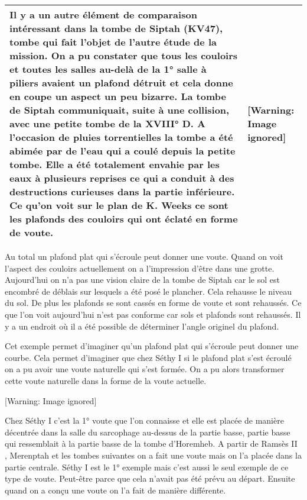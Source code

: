 \documentclass{article}
\begin{document}
\begin{flushleft}
\tablehead{}
\begin{supertabular}{|m{8.919001cm}|m{8.937cm}|}
\hline
Il y a un autre élément de comparaison intéressant dans la tombe de
Siptah (KV47), tombe qui fait l’objet de l’autre étude de la mission.
On a pu constater que tous les couloirs et toutes les salles au-delà de
la 1° salle à piliers avaient un plafond détruit et cela donne en coupe
un aspect un peu bizarre. La tombe de Siptah communiquait, suite à une
collision, avec une petite tombe de la XVIII° D. A l’occasion de pluies
torrentielles la tombe a été abimée par de l’eau qui a coulé depuis la
petite tombe. Elle a été totalement envahie par les eaux à plusieurs
reprises ce qui a conduit à des destructions curieuses dans la partie
inférieure. Ce qu’on voit sur le plan de K. Weeks ce sont les plafonds
des couloirs qui ont éclaté en forme de voute. 

 &
  [Warning: Image ignored] %
 \\\hline
\end{supertabular}
\end{flushleft}
Au total un plafond plat qui s’écroule peut donner une voute. Quand on
voit l’aspect des couloirs  actuellement on a l’impression d’être dans
une  grotte. Aujourd’hui on n’a pas une vision claire de la tombe de
Siptah car le sol est encombré de déblais sur lesquels a été posé le
plancher. Cela rehausse le niveau du sol. De plus les plafonds se sont
cassés en forme de voute et sont rehaussés. Ce que l’on voit
aujourd’hui n’est pas conforme car sols et plafonds sont rehaussés. Il
y a un endroit où il a été possible de déterminer l’angle originel du
plafond.

Cet exemple permet d’imaginer qu’un plafond plat qui s’écroule peut
donner une courbe. Cela permet d’imaginer que chez Séthy I si le
plafond plat s’est écroulé on a pu avoir une voute naturelle qui s’est
formée. On a pu alors transformer cette voute naturelle dans la forme
de la voute actuelle.

  [Warning: Image ignored] %
 

Chez Séthy I c’est la 1° voute que l’on connaisse et elle est placée de
manière décentrée dans la salle du sarcophage au-dessus de la partie
basse, partie basse qui ressemblait à la partie basse de la tombe
d’Horemheb. A partir de Ramsès II , Merenptah et les tombes suivantes
on a fait une voute mais on l’a placée dans la partie centrale. Séthy I
est le 1° exemple mais c’est aussi le seul exemple de ce type de voute.
Peut-être parce que cela n’avait pas été prévu au départ. Ensuite quand
on a conçu une voute on l’a fait de manière différente.
\end{document}
